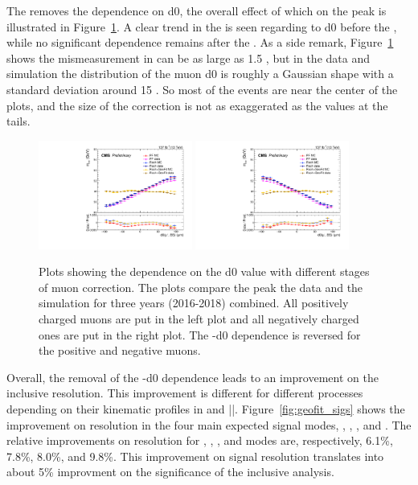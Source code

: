 The \GeoFit removes the \pt dependence on d0, 
the overall effect of which on the \zmm peak is illustrated in Figure~\ref{fig:mucal_d0_run2}.
A clear trend in the \mmm is seen regarding to d0 before the \GeoFit, 
while no significant dependence remains after the \GeoFit.
As a side remark, Figure~\ref{fig:mucal_d0_run2} shows the mismeasurement in \mmm can be as large as 1.5 \GeV,
but in the data and simulation the distribution of the muon d0 is roughly a Gaussian shape with a standard deviation around 15 \mum.
So most of the events are near the center of the plots, and the size of the correction is not as exaggerated as the values at the tails. 

\begin{figure}[!htb]
      \centering
      \captionsetup{justification=justified}
      \includegraphics[width=0.45\textwidth]{pics/muon_corr/GeoFit/performance/muP_d0_summary_mean.pdf}
      \includegraphics[width=0.45\textwidth]{pics/muon_corr/GeoFit/performance/muN_d0_summary_mean.pdf}
      \caption{Plots showing the \pt dependence on the d0 value with different stages of muon correction.
               The plots compare the \zmm peak the data and the simulation for three years (2016-2018) combined.
               All positively charged muons are put in the left plot and all negatively charged ones are put in the right plot.
               The \pt-d0 dependence is reversed for the positive and negative muons.
               }
      \label{fig:mucal_d0_run2}
\end{figure}

Overall, the removal of the \pt-d0 dependence leads to an improvement on the inclusive \mmm resolution.
This improvement is different for different processes depending on their kinematic profiles in \pt and |\eta|.
Figure~\ref{fig:geofit_sigs} shows the improvement on \mmm resolution in the four main expected signal modes, \ggH, \qqH, \VH, and \ttH.
The relative improvements on \mmm resolution for \ggH, \qqH, \VH, and \ttH modes are, 
respectively, 6.1\%, 7.8\%, 8.0\%, and 9.8\%.
This improvement on signal resolution translates into about 5\% improvment on the significance of the inclusive \hmm analysis.

